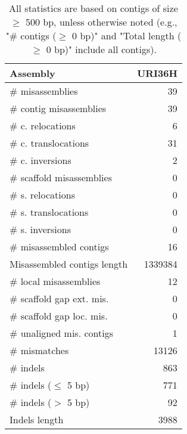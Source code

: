 \documentclass[12pt,a4paper]{article}
\begin{document}
\begin{table}[ht]
\begin{center}
\caption{All statistics are based on contigs of size $\geq$ 500 bp, unless otherwise noted (e.g., "\# contigs ($\geq$ 0 bp)" and "Total length ($\geq$ 0 bp)" include all contigs).}
\begin{tabular}{|l*{1}{|r}|}
\hline
Assembly & URI36H \\ \hline
\# misassemblies & 39 \\ \hline
\hspace{2mm}\# contig misassemblies & 39 \\ \hline
\hspace{5mm}\# c. relocations & 6 \\ \hline
\hspace{5mm}\# c. translocations & 31 \\ \hline
\hspace{5mm}\# c. inversions & 2 \\ \hline
\hspace{2mm}\# scaffold misassemblies & 0 \\ \hline
\hspace{5mm}\# s. relocations & 0 \\ \hline
\hspace{5mm}\# s. translocations & 0 \\ \hline
\hspace{5mm}\# s. inversions & 0 \\ \hline
\# misassembled contigs & 16 \\ \hline
Misassembled contigs length & 1339384 \\ \hline
\# local misassemblies & 12 \\ \hline
\# scaffold gap ext. mis. & 0 \\ \hline
\# scaffold gap loc. mis. & 0 \\ \hline
\# unaligned mis. contigs & 1 \\ \hline
\# mismatches & 13126 \\ \hline
\# indels & 863 \\ \hline
\hspace{5mm}\# indels ($\leq$ 5 bp) & 771 \\ \hline
\hspace{5mm}\# indels ($>$ 5 bp) & 92 \\ \hline
Indels length & 3988 \\ \hline
\end{tabular}
\end{center}
\end{table}
\end{document}
